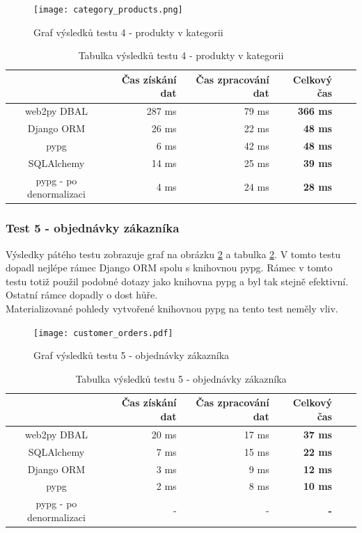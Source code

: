 \documentclass[ing,male,java,dept456]{diploma}						%
\begin{document}
\begin{figure}[h!]
    \centering
    \texttt{[image: category\_products.png]}
    \caption{Graf výsledků testu 4 - produkty v kategorii}
    \label{fig:TestCP}
\end{figure}
\begin{table}[h!]
  \centering
  \begin{tabular}{|c|r|r|r|r|r|}
    \hline
    & Čas získání dat & Čas zpracování dat & \textbf{Celkový čas} \\
    \hline
    web2py DBAL & 287 ms & 79 ms & \textbf{366 ms} \\
    \hline
    Django ORM & 26 ms & 22 ms & \textbf{48 ms} \\
    \hline
    pypg & 6 ms & 42 ms & \textbf{48 ms} \\
    \hline
    SQLAlchemy & 14 ms & 25 ms & \textbf{39 ms} \\
    \hline
    pypg - po denormalizaci & 4 ms & 24 ms & \textbf{28 ms} \\
    \hline
  \end{tabular}
  \caption{Tabulka výsledků testu 4 - produkty v kategorii}
  \label{tab:TestCP}
\end{table}
\clearpage

\subsubsection{Test 5 - objednávky zákazníka}
Výsledky pátého testu zobrazuje graf na obrázku \ref{fig:TestCO} a tabulka \ref{tab:TestCO}. V tomto testu dopadl nejlépe rámec Django ORM spolu s knihovnou pypg. Rámec v tomto testu totiž použil podobné dotazy jako knihovna pypg a byl tak stejně efektivní. Ostatní rámce dopadly o dost hůře. \\
Materializované pohledy vytvořené knihovnou pypg na tento test neměly vliv.

\begin{figure}[h!]
    \centering
    \texttt{[image: customer\_orders.pdf]}
    \caption{Graf výsledků testu 5 - objednávky zákazníka}
    \label{fig:TestCO}
\end{figure}
\begin{table}[h!]
  \centering
  \begin{tabular}{|c|r|r|r|r|r|}
    \hline
    & Čas získání dat & Čas zpracování dat & \textbf{Celkový čas} \\
    \hline
    web2py DBAL & 20 ms & 17 ms & \textbf{37 ms} \\
    \hline
    SQLAlchemy & 7 ms & 15 ms & \textbf{22 ms} \\
    \hline
    Django ORM & 3 ms & 9 ms & \textbf{12 ms} \\
    \hline
    pypg & 2 ms & 8 ms & \textbf{10 ms} \\
    \hline
    pypg - po denormalizaci & - & - & \textbf{-} \\
    \hline
  \end{tabular}
  \caption{Tabulka výsledků testu 5 - objednávky zákazníka}
  \label{tab:TestCO}
\end{table}
\end{document}

